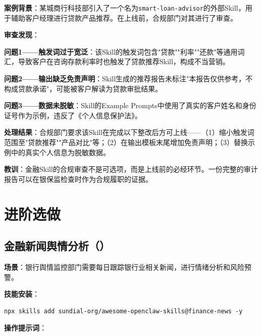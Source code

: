 \begin{casebox}[金融Skill的银保监合规审查案例]
\textbf{案例背景}：某城商行科技部引入了一个名为\texttt{smart-loan-advisor}的外部Skill，用于辅助客户经理进行贷款产品推荐。在上线前，合规部门对其进行了审查。

\textbf{审查发现}：

\textbf{问题1——触发词过于宽泛}：该Skill的触发词包含"贷款""利率""还款"等通用词汇，导致客户在咨询存款利率时也触发了贷款推荐Skill，构成不当营销。

\textbf{问题2——输出缺乏免责声明}：Skill生成的推荐报告未标注"本报告仅供参考，不构成贷款承诺"，可能被客户解读为贷款审批结果。

\textbf{问题3——数据未脱敏}：Skill的Example Prompts中使用了真实的客户姓名和身份证号作为示例，违反了《个人信息保护法》。

\textbf{处理结果}：合规部门要求该Skill在完成以下整改后方可上线——（1）缩小触发词范围至"贷款推荐""产品对比"等；（2）在输出模板末尾增加免责声明；（3）替换示例中的真实个人信息为脱敏数据。

\textbf{教训}：金融Skill的合规审查不是可选项，而是上线前的必经环节。一份完整的审计报告可以在银保监检查时作为合规履职的证据。
\end{casebox}

\section{进阶选做}

\subsection{金融新闻舆情分析（）}

\textbf{场景}：银行舆情监控部门需要每日跟踪银行业相关新闻，进行情绪分析和风险预警。

\textbf{技能安装}：

\begin{lstlisting}[style=shell]
npx skills add sundial-org/awesome-openclaw-skills@finance-news -y
\end{lstlisting}

\textbf{操作提示词}：

